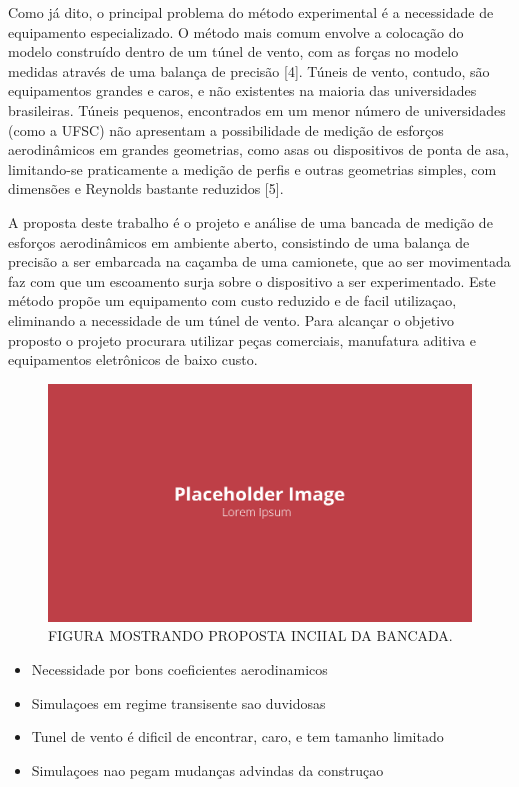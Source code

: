 Como já dito, o principal problema do método experimental é a necessidade de equipamento especializado. O método mais comum envolve a colocação do modelo construído dentro de um túnel de vento, com as forças no modelo medidas através de uma balança de precisão [4]. Túneis de vento, contudo, são equipamentos grandes e caros, e não existentes na maioria das universidades brasileiras. Túneis pequenos, encontrados em um menor número de universidades (como a UFSC) não apresentam a possibilidade de medição de esforços aerodinâmicos em grandes geometrias, como asas ou dispositivos de ponta de asa, limitando-se praticamente a medição de perfis e outras geometrias simples, com dimensões e Reynolds bastante reduzidos [5].

A proposta deste trabalho é o projeto e análise de uma bancada de medição de esforços aerodinâmicos em ambiente aberto, consistindo de uma balança de precisão a ser embarcada na caçamba de uma camionete, que ao ser movimentada faz com que um escoamento surja sobre o dispositivo a ser experimentado. Este método propõe um equipamento com custo reduzido e de facil utilizaçao, eliminando a necessidade de um túnel de vento. Para alcançar o objetivo proposto o projeto procurara utilizar peças comerciais, manufatura aditiva e equipamentos eletrônicos de baixo custo.

\begin{figure}[!ht]
    \centering
    \includegraphics[width=.8\linewidth]{figuras/placeholder.png}
    \caption{FIGURA MOSTRANDO PROPOSTA INCIIAL DA BANCADA\cite{autor}.}
    \label{fig:placeholder}
\end{figure}

\begin{itemize}
    \item Necessidade por bons coeficientes aerodinamicos
    \item Simulaçoes em regime transisente sao duvidosas
    \item Tunel de vento é dificil de encontrar, caro, e tem tamanho limitado
    \item Simulaçoes nao pegam mudanças advindas da construçao
\end{itemize}